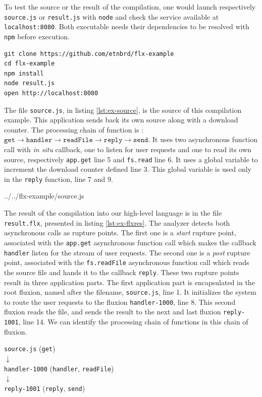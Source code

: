 To test the source or the result of the compilation, one would launch respectively \texttt{source.js} or \texttt{result.js} with \texttt{node} and check the service available at \texttt{localhost:8080}.
Both executable needs their dependencies to be resolved with \texttt{npm} before execution.
\begin{verbatim}
git clone https://github.com/etnbrd/flx-example
cd flx-example
npm install
node result.js
open http://localhost:8080
\end{verbatim}

The file \texttt{source.js}, in listing \ref{lst:ex-source}, is the source of this compilation example.
This application sends back its own source along with a download counter.
The processing chain of function is : $\texttt{get} \to \texttt{handler} \to \texttt{readFile} \to \texttt{reply} \to \texttt{send}$.
It uses two asynchronous function call with \textit{in situ} callback, one to listen for user requests and one to read its own source, respectively \texttt{app.get} line 5 and \texttt{fs.read} line 6.
It uses a global variable to increment the download counter defined line 3.
This global variable is used only in the \texttt{reply} function, line 7 and 9.

{../../flx-example/source.js}

The result of the compilation into our high-level language is in the file \texttt{result.flx}, presented in listing \ref{lst:ex-flxres}.
The analyzer detects both asynchronous calls as rupture points.
The first one is a \textit{start} rupture point, associated with the \texttt{app.get} asynchronous function call which makes the callback \texttt{handler} listen for the stream of user requests. 
The second one is a \textit{post} rupture point, associated with the \texttt{fs.readFile} asynchronous function call which reads the source file and hands it to the callback \texttt{reply}.
These two rupture points result in three application parts.
The first application part is encapsulated in the root fluxion, named after the filename, \texttt{source.js}, line 1.
It initializes the system to route the user requests to the fluxion \texttt{handler-1000}, line 8.
This second fluxion reads the file, and sends the result to the next and last fluxion \texttt{reply-1001}, line 14.
We can identify the processing chain of functions in this chain of fluxion.

\begin{center}
\texttt{source.js} (\texttt{get})\\
$\downarrow$\\
\texttt{handler-1000} (\texttt{handler}, \texttt{readFile})\\
$\downarrow$\\
\texttt{reply-1001} (\texttt{reply}, \texttt{send})
\end{center}

